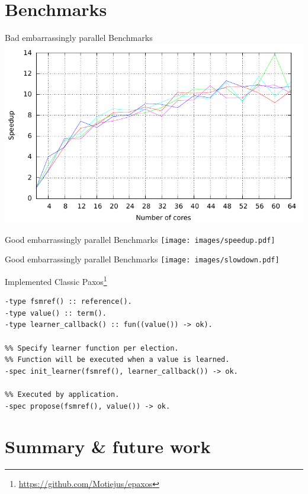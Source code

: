 \documentclass[14pt]{beamer}
\begin{document}
\section{Benchmarks}

\begin{frame}{Bad embarrassingly parallel Benchmarks}
    \pause
        \includegraphics[width=\textwidth]{images/bad_speedup.pdf}
\end{frame}

\begin{frame}{Good embarrassingly parallel Benchmarks}
    \texttt{[image: images/speedup.pdf]}
\end{frame}

\begin{frame}{Good embarrassingly parallel Benchmarks}
    \texttt{[image: images/slowdown.pdf]}
\end{frame}

\begin{frame}[fragile]{Implemented Classic Paxos\footnote{
    \url{https://github.com/Motiejus/epaxos}}}

        \fontsize{11pt}{14}\selectfont \begin{verbatim}
-type fsmref() :: reference().
-type value() :: term().
-type learner_callback() :: fun((value()) -> ok).

%% Specify learner function per election.
%% Function will be executed when a value is learned.
-spec init_learner(fsmref(), learner_callback()) -> ok.

%% Executed by application.
-spec propose(fsmref(), value()) -> ok.
    \end{verbatim}
\end{frame}

\section{Summary \& future work}
\end{document}
